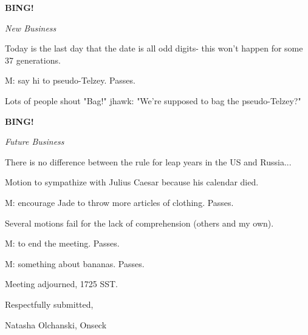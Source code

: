 \documentclass[12pt]{article}
\newcommand{\bing}{{\bf BING!} }
\newcommand{\goto}[1]{\bing \vskip 12pt \centerline{{\em{#1}}}}
\begin{document}
\goto{New Business}

Today is the last day that the date is all odd digits- this won't happen for some 37 generations.

M: say hi to pseudo-Telzey. Passes.

Lots of people shout "Bag!" jhawk: "We're supposed to bag the pseudo-Telzey?"

\goto{Future Business}

There is no difference between the rule for leap years in the US and Russia...

Motion to sympathize with Julius Caesar because his calendar died.

M: encourage Jade to throw more articles of clothing. Passes.

Several motions fail for the lack of comprehension (others and my own).

M: to end the meeting. Passes.

M: something about bananas. Passes.

\vspace{12pt}

\noindent
Meeting adjourned, 1725 SST.

\vspace{18pt}

\centerline{Respectfully submitted,}
\centerline{Natasha Olchanski, Onseck}
\end{document}
